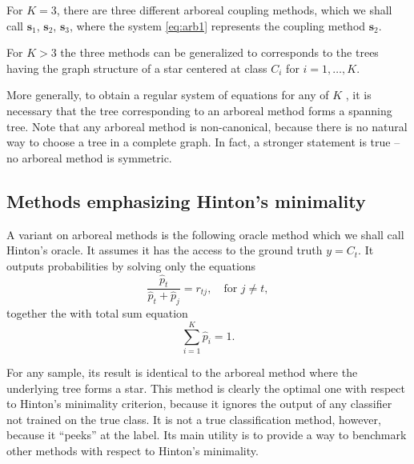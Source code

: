 For $K=3$, there are three different arboreal coupling methods, which we shall call $\boldsymbol{s}_1$, $\boldsymbol{s}_2$, $\boldsymbol{s}_3$, where the system \eqref{eq:arb1} represents the coupling method $\boldsymbol{s}_2$.

For $K>3$ the three methods can be generalized to corresponds to the trees having the graph structure  of a star centered at class $C_i$ for $i=1, \ldots, K$.

More generally, to obtain a regular system of equations for  any of $K$ , it is necessary that the tree corresponding to an arboreal method forms a spanning tree. Note that any arboreal method is non-canonical, because there is no natural way to choose a tree in a complete graph. In fact, a stronger statement is true -- no arboreal method is symmetric.



\subsection{Methods emphasizing Hinton's minimality}

A variant on arboreal methods is the following oracle method which we shall call Hinton's oracle. It  assumes it has the access to the ground truth $y = C_t$. It outputs probabilities by solving only the equations
$$
\frac{\hat p_t}{\hat p_t + \hat p_j} = {r}_{tj},\quad \textrm{for }j\not = t,
$$
together the  with total sum equation
$$
\sum_{i=1}^K  \hat p_i = 1.
$$

For any sample, its result is identical to the arboreal method where the underlying tree forms a star. This method is clearly the optimal one with respect to Hinton's minimality criterion, because it ignores the output of any classifier not trained on the true class. It is not a true classification method, however, because it ``peeks'' at the label. Its main utility is to provide a way to benchmark other methods with respect to Hinton's minimality.

